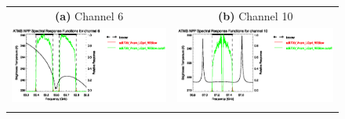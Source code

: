 \begin{figure}[htp]
  \centering
  \begin{tabular}{c c}
    \textsf{\textbf{(a)} Channel 6} &
    \textsf{\textbf{(b)} Channel 10} \\
    \includegraphics[bb=70 400 300 559,clip,scale=1.0]{graphics/srf/Rset/atms_npp.ch6.osrf.eps} &
    \includegraphics[bb=70 400 300 559,clip,scale=1.0]{graphics/srf/Rset/atms_npp.ch10.osrf.eps} \\\\


\end{tabular}
\end{figure}
